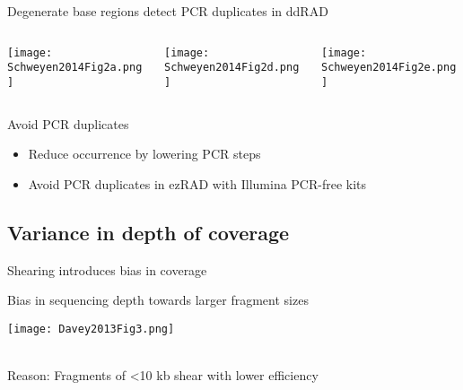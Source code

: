 \documentclass[presentation]{beamer}
\begin{document}
\begin{frame}[label=sec-3-2-3]{Degenerate base regions detect PCR duplicates in ddRAD \citep{Tin2014,Schweyen2014}}
\vspace{0.1cm}

\begin{columns}
\begin{column}{0.3\columnwidth}
\begin{raggedright}
\texttt{[image: Schweyen2014Fig2a.png]}
\end{raggedright}
\end{column}

\begin{column}{0.3\columnwidth}
\begin{raggedleft}
\texttt{[image: Schweyen2014Fig2d.png]}
\end{raggedleft}
\end{column}

\begin{column}{0.3\columnwidth}
\begin{raggedleft}
\texttt{[image: Schweyen2014Fig2e.png]}
\end{raggedleft}
\tiny{\citep{Schweyen2014}}
\end{column}
\end{columns}
\end{frame}

\begin{frame}[label=sec-3-2-4]{Avoid PCR duplicates}
\begin{itemize}
\item Reduce occurrence by lowering PCR steps
\item Avoid PCR duplicates in ezRAD with Illumina PCR-free kits
\end{itemize}
\end{frame}


\subsection{Variance in depth of coverage}
\label{sec-3-3}
\begin{frame}[label=sec-3-3-1]{Shearing introduces bias in coverage}
 \begin{center}
Bias in sequencing depth towards larger fragment sizes

\texttt{[image: Davey2013Fig3.png]}

 \tiny{\citep{Davey2013}}\\
\normalsize{
Reason: Fragments of <10 kb shear with lower efficiency}
 \end{center}
\end{frame}
\end{document}
